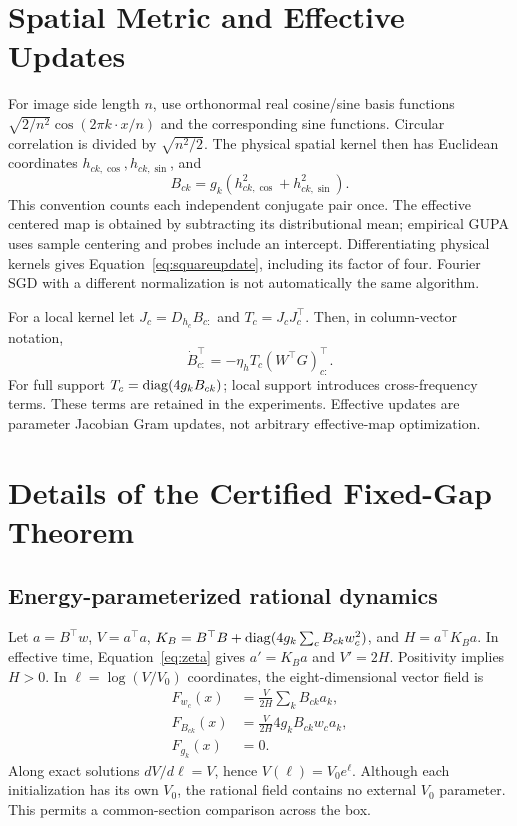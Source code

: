 \section{Spatial Metric and Effective Updates}
\label{app:metric}
For image side length $n$, use orthonormal real cosine/sine basis functions $\sqrt{2/n^2}\cos(2\pi k\cdot x/n)$ and the corresponding sine functions. Circular correlation is divided by $\sqrt{n^2/2}$. The physical spatial kernel then has Euclidean coordinates $h_{ck,\cos},h_{ck,\sin}$, and
\begin{equation}
B_{ck}=g_k(h_{ck,\cos}^2+h_{ck,\sin}^2).
\end{equation}
This convention counts each independent conjugate pair once. The effective centered map is obtained by subtracting its distributional mean; empirical GUPA uses sample centering and probes include an intercept. Differentiating physical kernels gives Equation~\eqref{eq:squareupdate}, including its factor of four. Fourier SGD with a different normalization is not automatically the same algorithm.

For a local kernel let $J_c=D_{h_c}B_{c:}$ and $T_c=J_cJ_c^\top$. Then, in column-vector notation,
\begin{equation}
\dot B_{c:}^{\top}=-\eta_h T_c(W^\top G)_{c:}^{\top}.
\end{equation}
For full support $T_c=\operatorname{diag}(4g_kB_{ck})$; local support introduces cross-frequency terms. These terms are retained in the experiments. Effective updates are parameter Jacobian Gram updates, not arbitrary effective-map optimization.

\section{Details of the Certified Fixed-Gap Theorem}
\label{app:certificate}
\subsection{Energy-parameterized rational dynamics}
Let $a=B^\top w$, $V=a^\top a$, $K_B=B^\top B+\operatorname{diag}(4g_k\sum_cB_{ck}w_c^2)$, and $H=a^\top K_Ba$. In effective time, Equation~\eqref{eq:zeta} gives $a'=K_Ba$ and $V'=2H$. Positivity implies $H>0$. In $\ell=\log(V/V_0)$ coordinates, the eight-dimensional vector field is
\begin{align}
F_{w_c}(x)&=\frac{V}{2H}\sum_k B_{ck}a_k,\\
F_{B_{ck}}(x)&=\frac{V}{2H}4g_kB_{ck}w_ca_k,\\
F_{g_k}(x)&=0.
\label{eq:certfield}
\end{align}
Along exact solutions $dV/d\ell=V$, hence $V(\ell)=V_0e^\ell$. Although each initialization has its own $V_0$, the rational field contains no external $V_0$ parameter. This permits a common-section comparison across the box.

